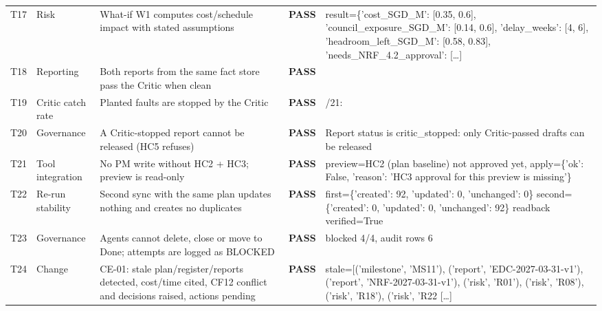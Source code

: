 {\begin{longtable}{@{}>{\raggedright\arraybackslash}p{0.75cm}>{\raggedright\arraybackslash}p{1.9cm}>{\raggedright\arraybackslash}p{4.2cm}>{\raggedright\arraybackslash}p{1.0cm}>{\raggedright\arraybackslash}p{6.9cm}@{}}
T17 & Risk & What-if W1 computes cost/schedule impact with stated assumptions & \textbf{PASS} & {\ttfamily result=\allowbreak{}\{'cost\_SGD\_M': [0.35,\allowbreak{} 0.6],\allowbreak{} 'council\_exposure\_SGD\_M': [0.14,\allowbreak{} 0.6],\allowbreak{} 'delay\_weeks': [4,\allowbreak{} 6],\allowbreak{} 'headroom\_left\_SGD\_M': [0.58,\allowbreak{} 0.83],\allowbreak{} 'needs\_NRF\_4.2\_approval': } [\ldots] \\
T18 & Reporting & Both reports from the same fact store pass the Critic when clean & \textbf{PASS} & {} \\
T19 & Critic catch rate & Planted faults are stopped by the Critic & \textbf{PASS} & {\ttfamily 21/\allowbreak{}21: } \\
T20 & Governance & A Critic-stopped report cannot be released (HC5 refuses) & \textbf{PASS} & {\ttfamily Report status is critic\_stopped: only Critic-passed drafts can be released} \\
T21 & Tool integration & No PM write without HC2 + HC3; preview is read-only & \textbf{PASS} & {\ttfamily preview=\allowbreak{}HC2 (plan baseline) not approved yet,\allowbreak{} apply=\allowbreak{}\{'ok': False,\allowbreak{} 'reason': 'HC3 approval for this preview is missing'\}} \\
T22 & Re-run stability & Second sync with the same plan updates nothing and creates no duplicates & \textbf{PASS} & {\ttfamily first=\allowbreak{}\{'created': 92,\allowbreak{} 'updated': 0,\allowbreak{} 'unchanged': 0\} second=\allowbreak{}\{'created': 0,\allowbreak{} 'updated': 0,\allowbreak{} 'unchanged': 92\} readback verified=\allowbreak{}True} \\
T23 & Governance & Agents cannot delete, close or move to Done; attempts are logged as BLOCKED & \textbf{PASS} & {\ttfamily blocked 4/\allowbreak{}4,\allowbreak{} audit rows 6} \\
T24 & Change & CE-01: stale plan/register/reports detected, cost/time cited, CF12 conflict and decisions raised, actions pending & \textbf{PASS} & {\ttfamily stale=\allowbreak{}[('milestone',\allowbreak{} 'MS11'),\allowbreak{} ('report',\allowbreak{} 'EDC-2027-03-31-v1'),\allowbreak{} ('report',\allowbreak{} 'NRF-2027-03-31-v1'),\allowbreak{} ('risk',\allowbreak{} 'R01'),\allowbreak{} ('risk',\allowbreak{} 'R08'),\allowbreak{} ('risk',\allowbreak{} 'R18'),\allowbreak{} ('risk',\allowbreak{} 'R22} [\ldots] \\

\end{longtable}}
